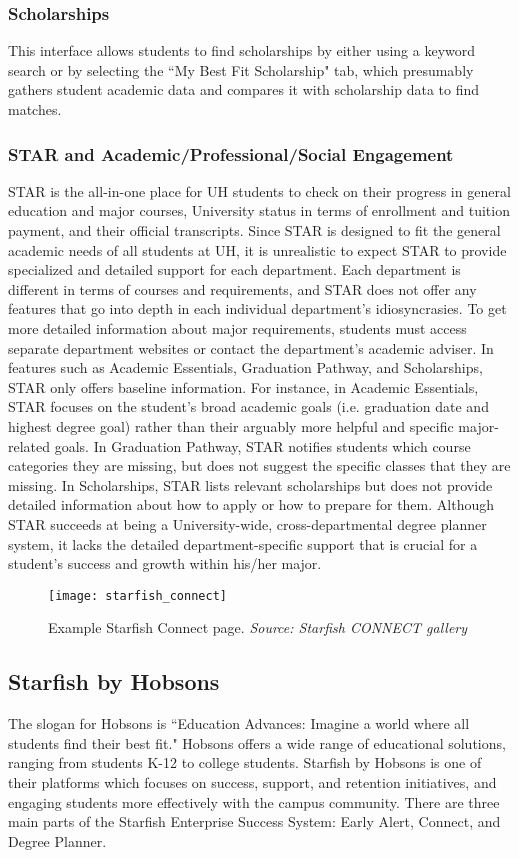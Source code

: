 \subsubsection{Scholarships}
This interface allows students to find scholarships by either using a keyword search or by selecting the ``My Best Fit Scholarship" tab, which presumably gathers student academic data and compares it with scholarship data to find matches.

\subsubsection{STAR and Academic/Professional/Social Engagement}
STAR is the all-in-one place for UH students to check on their progress in general education and major courses, University status in terms of enrollment and tuition payment, and their official transcripts. Since STAR is designed to fit the general academic needs of all students at UH, it is unrealistic to expect STAR to provide specialized and detailed support for each department. Each department is different in terms of courses and requirements, and STAR does not offer any features that go into depth in each individual department's idiosyncrasies. To get more detailed information about major requirements, students must access separate department websites or contact the department's academic adviser. 
In features such as Academic Essentials, Graduation Pathway, and Scholarships, STAR only offers baseline information. For instance, in Academic Essentials, STAR focuses on the student's broad academic goals (i.e. graduation date and highest degree goal) rather than their arguably more helpful and specific major-related goals. In Graduation Pathway, STAR notifies students which course categories they are missing, but does not suggest the specific classes that they are missing. In Scholarships, STAR lists relevant scholarships but does not provide detailed information about how to apply or how to prepare for them. Although STAR succeeds at being a University-wide, cross-departmental degree planner system, it lacks the detailed department-specific support that is crucial for a student's success and growth within his/her major. 

\begin{figure}[h]
\centering
\texttt{[image: starfish\_connect]}
\caption{Example Starfish Connect page. \textit{Source: Starfish CONNECT gallery}}
\end{figure}
\subsection{Starfish by Hobsons}
The slogan for Hobsons is ``Education Advances: Imagine a world where all students find their best fit." \cite{Starfish} Hobsons offers a wide range of educational solutions, ranging from students K-12 to college students. Starfish by Hobsons is one of their platforms which focuses on success, support, and retention initiatives, and engaging students more effectively with the campus community. There are three main parts of the Starfish Enterprise Success System: Early Alert, Connect, and Degree Planner.
